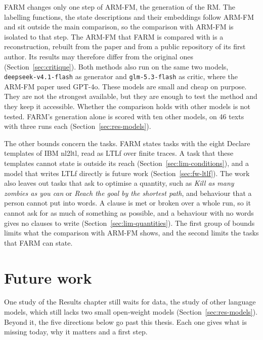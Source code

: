 \documentclass[11pt,english,listoffigures,listoftables]{tfgetsinf}
\begin{document}
FARM changes only one step of ARM-FM, the generation of the RM. The labelling functions, the state descriptions and their embeddings follow ARM-FM and sit outside the main comparison, so the comparison with ARM-FM is isolated to that step. The ARM-FM that FARM is compared with is a reconstruction, rebuilt from the paper and from a public repository of its first author. Its results may therefore differ from the original ones (Section~\ref{sec:critique}). Both methods also run on the same two models, \texttt{deepseek-v4.1-flash} as generator and \texttt{glm-5.3-flash} as critic, where the ARM-FM paper used GPT-4o. These models are small and cheap on purpose. They are not the strongest available, but they are enough to test the method and they keep it accessible. Whether the comparison holds with other models is not tested. FARM's generation alone is scored with ten other models, on 46 texts with three runs each (Section~\ref{sec:res-models}).

The other bounds concern the tasks. FARM states tasks with the eight Declare templates of IBM nl2ltl, read as LTLf over finite traces. A task that these templates cannot state is outside its reach (Section~\ref{sec:lim-conditions}), and a model that writes LTLf directly is future work (Section~\ref{sec:fw-ltlf}). The work also leaves out tasks that ask to optimise a quantity, such as \textit{Kill as many zombies as you can} or \textit{Reach the goal by the shortest path}, and behaviour that a person cannot put into words. A clause is met or broken over a whole run, so it cannot ask for as much of something as possible, and a behaviour with no words gives no clauses to write (Section~\ref{sec:lim-quantities}). The first group of bounds limits what the comparison with ARM-FM shows, and the second limits the tasks that FARM can state.


\chapter{Future work}
\label{chap:future-work}

One study of the Results chapter still waits for data, the study of other language models, which still lacks two small open-weight models (Section~\ref{sec:res-models}). Beyond it, the five directions below go past this thesis. Each one gives what is missing today, why it matters and a first step.
\end{document}

